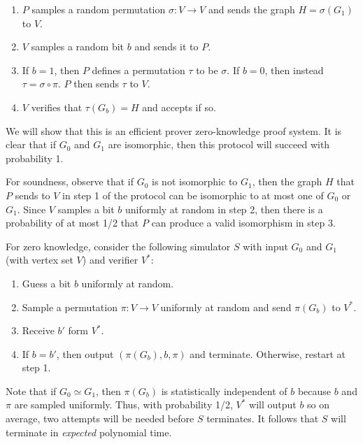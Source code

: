\begin{enumerate}
\item $P$ samples a random permutation $\sigma: V \to V$ and sends the graph $H = \sigma(G_1)$ to $V$.

\item $V$ samples a random bit $b$ and sends it to $P$.

\item If $b = 1$, then $P$ defines a permutation $\tau$ to be $\sigma$. If $b = 0$, then instead $\tau = \sigma \circ \pi$. $P$ then sends $\tau$ to $V$.

\item $V$ verifies that $\tau(G_b) = H$ and accepts if so.

\end{enumerate}

We will show that this is an efficient prover zero-knowledge proof system. It is clear that if $G_0$ and $G_1$ are isomorphic, then this protocol will succeed with probability 1.

For soundness, observe that if $G_0$ is not isomorphic to $G_1$, then the graph $H$ that $P$ sends to $V$ in step 1 of the protocol can be isomorphic to at most one of $G_0$ or $G_1$. Since $V$ samples a bit $b$ uniformly at random in step 2, then there is a probability of at most 1/2 that $P$ can produce a valid isomorphism in step 3.

For zero knowledge, consider the following simulator $S$ with input $G_0$ and $G_1$ (with vertex set $V$) and verifier $V^*$:

\begin{enumerate}
\item Guess a bit $b$ uniformly at random.

\item Sample a permutation $\pi: V \to V$ uniformly at random and send $\pi (G_b)$ to $V^*$.

\item Receive $b'$ form $V^*$.

\item If $b=b'$, then output $(\pi (G_b), b, \pi)$ and terminate. Otherwise, restart at step 1.

\end{enumerate}

Note that if $G_0 \simeq G_1$, then $\pi(G_b)$ is statistically independent of $b$ because $b$ and $\pi$ are sampled uniformly. Thus, with probability 1/2, $V^*$ will output $b$ so on average, two attempts will be needed before $S$ terminates. It follows that $S$ will terminate in \emph{expected} polynomial time.

